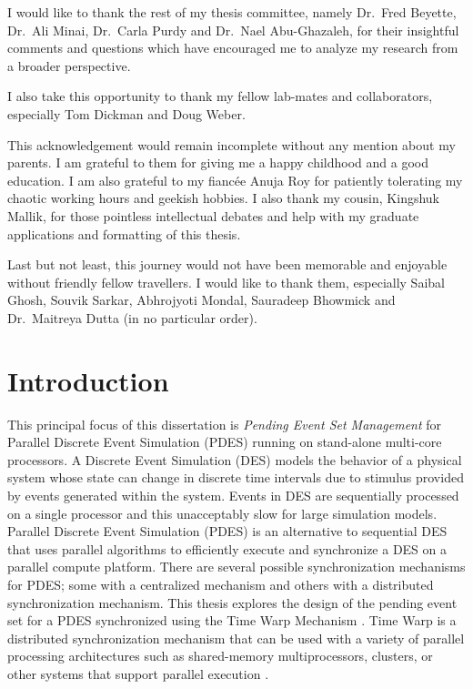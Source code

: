 \documentclass[11pt]{book}
\begin{document}
I would like to thank the rest of my thesis committee, namely Dr.\ Fred Beyette, Dr.\ Ali Minai, Dr.\ Carla
Purdy and Dr.\ Nael Abu-Ghazaleh, for their insightful comments and questions which have encouraged me to
analyze my research from a broader perspective.

I also take this opportunity to thank my fellow lab-mates and collaborators, especially Tom Dickman and
Doug Weber.

This acknowledgement would remain incomplete without any mention about my parents.  I am grateful to them
for giving me a happy childhood and a good education. I am also grateful to my fianc\'ee Anuja Roy for
patiently tolerating my chaotic working hours and geekish hobbies. I also thank my cousin, Kingshuk Mallik,
for those pointless intellectual debates and help with my graduate applications and formatting of this
thesis.

Last but not least, this journey would not have been memorable and enjoyable without friendly fellow
travellers. I would like to thank them, especially Saibal Ghosh, Souvik Sarkar, Abhrojyoti Mondal, Sauradeep
Bhowmick and Dr.\ Maitreya Dutta (in no particular order).


\tableofcontents    \markright{ }
\listoffigures      \markright{ }
\listoftables       \markright{ }
\listofalgorithms   \markright{ }

\clearpage
{} \setcounter{page}{2}

\chapter{Introduction}\label{chapter:introduction}

This principal focus of this dissertation is \emph{Pending Event Set Management} for Parallel Discrete Event
Simulation (PDES) running on stand-alone multi-core processors.  A Discrete Event Simulation (DES) models the
behavior of a physical system whose state can change in discrete time intervals due to stimulus provided by
events generated within the system.  Events in DES are sequentially processed on a single processor and this
unacceptably slow for large simulation models.  Parallel Discrete Event Simulation (PDES)
\cite{fujimoto-90,fujimoto-00} is an alternative to sequential DES that uses parallel algorithms to
efficiently execute and synchronize a DES on a parallel compute platform.  There are several possible
synchronization mechanisms for PDES; some with a centralized mechanism and others with a distributed
synchronization mechanism.  This thesis explores the design of the pending event set for a PDES synchronized
using the Time Warp Mechanism \cite{jefferson-85,fujimoto-90}.  Time Warp is a distributed synchronization
mechanism that can be used with a variety of parallel processing architectures such as shared-memory
multiprocessors, clusters, or other systems that support parallel execution \cite{culler-97,patterson-11}.
\end{document}
